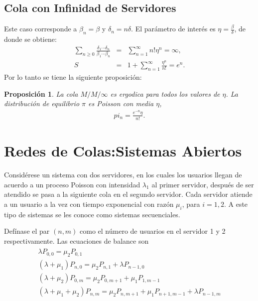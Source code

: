 \documentclass{article}
\newtheorem{Prop}{Proposición}[section]
\numberwithin{equation}{section}
\begin{document}
\subsection*{Cola con Infinidad de Servidores}
Este caso corresponde a $\beta_{n}=\beta$ y $\delta_{n}=n\delta$. El par\'ametro de inter\'es es $\eta=\frac{\beta}{\delta}$, de donde se obtiene:
\begin{eqnarray}
\sum_{n\geq0}\frac{\delta_{1}\cdots\delta_{n}}{\beta_{1}\cdots\beta_{n}}&=&\sum_{n=1}^{\infty}n!\eta^{n}=\infty,\\
S&=&1+\sum_{n=1}^{\infty}\frac{\eta^{n}}{n!}=e^{n}.
\end{eqnarray}
Por lo tanto se tiene la siguiente proposici\'on: 
\begin{Prop}
La cola $M/M/\infty$ es ergodica para todos los valores de $\eta$. La distribuci\'on de equilibrio $\pi$ es Poisson con media $\eta$, 
\begin{eqnarray}
pi_{n}=\frac{e^{-n}\eta}{n!}.
\end{eqnarray}
\end{Prop}
\section{Redes de Colas:Sistemas Abiertos}

Consid\'erese un sistema con dos servidores, en los cuales los usuarios llegan de acuerdo a un proceso Poisson con intensidad $\lambda_{1}$ al primer servidor, despu\'es de ser atendido se pasa a la siguiente cola en el segundo servidor. Cada servidor atiende a un usuario a la vez con tiempo exponencial con raz\'on $\mu_{i}$, para $i=1,2$. A este tipo de sistemas se les conoce como sistemas secuenciales.

Def\'inase el par $\left(n,m\right)$ como el n\'umero de usuarios en el servidor 1 y 2 respectivamente. Las ecuaciones de balance son
\begin{eqnarray}\label{Eq.Balance}
\begin{array}{c}
\lambda P_{0,0}=\mu_{2}P_{0,1}\\
\left(\lambda+\mu_{1}\right)P_{n,0}=\mu_{2}P_{n,1}+\lambda P_{n-1,0}\\
\left(\lambda+\mu_{2}\right)P_{0,m}=\mu_{2}P_{0,m+1}+\mu_{1}P_{1,m-1}\\
\left(\lambda+\mu_{1}+\mu_{2}\right)P_{n,m}=\mu_{2}P_{n,m+1}+\mu_{1}P_{n+1,m-1}+\lambda
P_{n-1,m}
\end{array}
\end{eqnarray}
\end{document}
